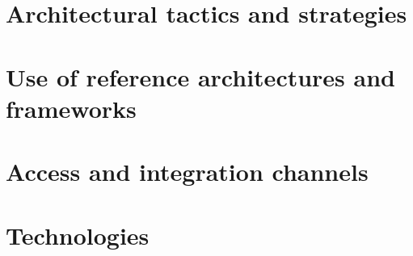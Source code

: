 \documentclass{article}
\begin{document}
\newpage

\section{Architectural tactics and strategies}

\newpage

\section{Use of reference architectures and frameworks}

\newpage

\section{Access and integration channels}

\newpage

\section{Technologies}
\end{document}
